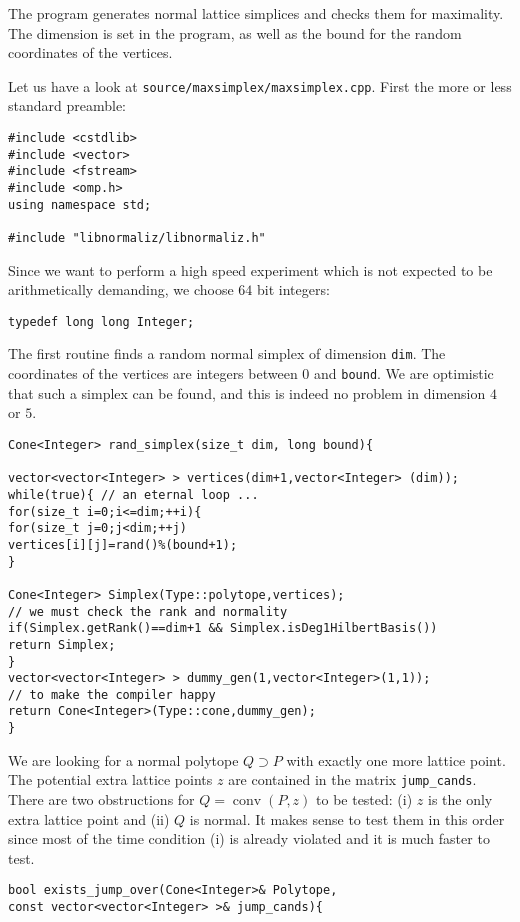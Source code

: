 \documentclass[12pt,a4paper]{scrartcl}
\theoremstyle{definition}
\begin{document}
\begin{small}
The program generates normal lattice simplices and checks them for maximality. The dimension is set in the program, as well as the bound for the random coordinates of the vertices.

Let us have a look at \verb|source/maxsimplex/maxsimplex.cpp|. First the more or less standard preamble:

\begin{Verbatim}
#include <cstdlib>
#include <vector>
#include <fstream>
#include <omp.h>
using namespace std;

#include "libnormaliz/libnormaliz.h"
\end{Verbatim}

Since we want to perform a high speed experiment which is not expected to be arithmetically demanding, we choose $64$ bit integers:
\begin{Verbatim}
typedef long long Integer;
\end{Verbatim}

The first routine finds a random normal simplex of dimension \verb|dim|. The coordinates of the vertices are integers between $0$ and \verb|bound|. We are optimistic that such a simplex can be found, and this is indeed no problem in dimension $4$ or $5$.

\begin{Verbatim}
Cone<Integer> rand_simplex(size_t dim, long bound){

vector<vector<Integer> > vertices(dim+1,vector<Integer> (dim));    
while(true){ // an eternal loop ...
for(size_t i=0;i<=dim;++i){
for(size_t j=0;j<dim;++j)
vertices[i][j]=rand()%(bound+1);            
}

Cone<Integer> Simplex(Type::polytope,vertices);
// we must check the rank and normality
if(Simplex.getRank()==dim+1 && Simplex.isDeg1HilbertBasis())
return Simplex;        
}
vector<vector<Integer> > dummy_gen(1,vector<Integer>(1,1)); 
// to make the compiler happy
return Cone<Integer>(Type::cone,dummy_gen); 
}
\end{Verbatim}

We are looking for a normal polytope $Q\supset P$ with exactly one more lattice point. The potential extra lattice points $z$ are contained in the matrix \verb|jump_cands|. There are two obstructions for $Q=\operatorname{conv}(P,z)$ to be tested: (i) $z$ is the only extra lattice point and (ii) $Q$ is normal. It makes sense to test them in this order since most of the time condition (i) is already violated and it is much faster to test.
\begin{Verbatim}
bool exists_jump_over(Cone<Integer>& Polytope, 
const vector<vector<Integer> >& jump_cands){


\end{Verbatim}
\end{small}
\end{document}
